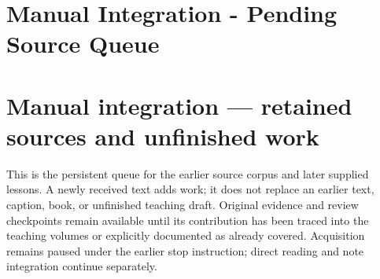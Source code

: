 \hypertarget{appendix-ac1f51db5e9a}{}
\section*{Manual Integration - Pending Source Queue}
\section{Manual integration --- retained sources and unfinished work}\label{appendix-ac1f51db5e9a-manual-integration-retained-sources-and-unfinished-work}

This is the persistent queue for the earlier source corpus and later supplied lessons. A newly received text adds work; it does not replace an earlier text, caption, book, or unfinished teaching draft. Original evidence and review checkpoints remain available until its contribution has been traced into the teaching volumes or explicitly documented as already covered. Acquisition remains paused under the earlier stop instruction; direct reading and note integration continue separately.


